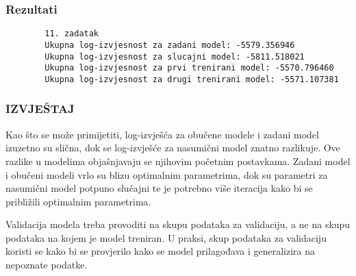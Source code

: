 \documentclass[12pt]{article}
\begin{document}
	\subsubsection*{Rezultati}
	\begin{verbatim}
		11. zadatak
		Ukupna log-izvjesnost za zadani model: -5579.356946
		Ukupna log-izvjesnost za slucajni model: -5811.518021
		Ukupna log-izvjesnost za prvi trenirani model: -5570.796460
		Ukupna log-izvjesnost za drugi trenirani model: -5571.107381
	\end{verbatim}
	
	\subsubsection*{IZVJEŠTAJ}
	Kao što se može primijetiti, log-izvješća za obučene modele i zadani model izuzetno su slična, dok se log-izvješće za nasumični model znatno razlikuje. Ove razlike u modelima objašnjavaju se njihovim početnim postavkama. Zadani model i obučeni modeli vrlo su blizu optimalnim parametrima, dok su parametri za nasumični model potpuno slučajni te je potrebno više iteracija kako bi se približili optimalnim parametrima.
	
	Validacija modela treba provoditi na skupu podataka za validaciju, a ne na skupu podataka na kojem je model treniran. U praksi, skup podataka za validaciju koristi se kako bi se provjerilo kako se model prilagođava i generalizira na nepoznate podatke.
	
	

	
\end{document}
